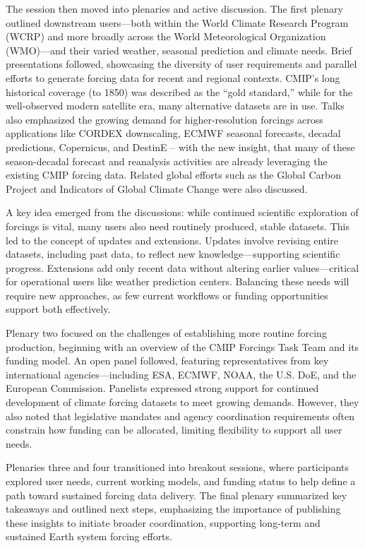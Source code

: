 \documentclass{ametsocV6.1}
\begin{document}
The session then moved into plenaries and active discussion. The first plenary outlined downstream users—both within the World Climate Research Program (WCRP) and more broadly across the World Meteorological Organization (WMO)—and their varied weather, seasonal prediction and climate needs. Brief presentations followed, showcasing the diversity of user requirements and parallel efforts to generate forcing data for recent and regional contexts. CMIP’s long historical coverage (to 1850) was described as the ``gold standard,'' while for the well-observed modern satellite era, many alternative datasets are in use. Talks also emphasized the growing demand for higher-resolution forcings across applications like CORDEX downscaling, ECMWF seasonal forecasts, decadal predictions, Copernicus, and DestinE – with the new insight, that many of these season-decadal forecast and reanalysis activities are already leveraging the existing CMIP forcing data. Related global efforts such as the Global Carbon Project \citep{friedlingstein_global_2024} and Indicators of Global Climate Change \citep{forster_indicators_2024} were also discussed.

A key idea emerged from the discussions: while continued scientific exploration of forcings is vital, many users also need routinely produced, stable datasets. This led to the concept of updates and extensions. Updates involve revising entire datasets, including past data, to reflect new knowledge—supporting scientific progress. Extensions add only recent data without altering earlier values—critical for operational users like weather prediction centers. Balancing these needs will require new approaches, as few current workflows or funding opportunities support both effectively.

Plenary two focused on the challenges of establishing more routine forcing production, beginning with an overview of the CMIP Forcings Task Team and its funding model. An open panel followed, featuring representatives from key international agencies—including ESA, ECMWF, NOAA, the U.S. DoE, and the European Commission. Panelists expressed strong support for continued development of climate forcing datasets to meet growing demands. However, they also noted that legislative mandates and agency coordination requirements often constrain how funding can be allocated, limiting flexibility to support all user needs.

Plenaries three and four transitioned into breakout sessions, where participants explored user needs, current working models, and funding status to help define a path toward sustained forcing data delivery. The final plenary summarized key takeaways and outlined next steps, emphasizing the importance of publishing these insights to initiate broader coordination, supporting long-term and sustained Earth system forcing efforts.
\end{document}
